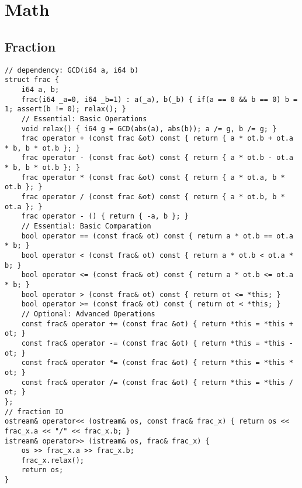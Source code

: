 \documentclass[landscape, 8pt, a4paper, oneside, twocolumn]{extarticle}
\begin{document}
\section{Math}
\subsection {Fraction}
\begin{verbatim}
// dependency: GCD(i64 a, i64 b)
struct frac {
	i64 a, b;
	frac(i64 _a=0, i64 _b=1) : a(_a), b(_b) { if(a == 0 && b == 0) b = 1; assert(b != 0); relax(); }
	// Essential: Basic Operations
	void relax() { i64 g = GCD(abs(a), abs(b)); a /= g, b /= g; }
	frac operator + (const frac &ot) const { return { a * ot.b + ot.a * b, b * ot.b }; }
	frac operator - (const frac &ot) const { return { a * ot.b - ot.a * b, b * ot.b }; }
	frac operator * (const frac &ot) const { return { a * ot.a, b * ot.b }; }
	frac operator / (const frac &ot) const { return { a * ot.b, b * ot.a }; }
	frac operator - () { return { -a, b }; }
	// Essential: Basic Comparation
	bool operator == (const frac& ot) const { return a * ot.b == ot.a * b; }
	bool operator < (const frac& ot) const { return a * ot.b < ot.a * b; }
	bool operator <= (const frac& ot) const { return a * ot.b <= ot.a * b; }
	bool operator > (const frac& ot) const { return ot <= *this; }
	bool operator >= (const frac& ot) const { return ot < *this; }
	// Optional: Advanced Operations
	const frac& operator += (const frac &ot) { return *this = *this + ot; }
	const frac& operator -= (const frac &ot) { return *this = *this - ot; }
	const frac& operator *= (const frac &ot) { return *this = *this * ot; }
	const frac& operator /= (const frac &ot) { return *this = *this / ot; }
};
// fraction IO
ostream& operator<< (ostream& os, const frac& frac_x) { return os << frac_x.a << "/" << frac_x.b; }
istream& operator>> (istream& os, frac& frac_x) {
	os >> frac_x.a >> frac_x.b;
	frac_x.relax();
	return os;
}
\end{verbatim}
\end{document}
